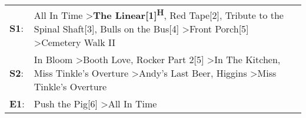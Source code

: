 \begin{supertabular}{p{0.03\textwidth}p{0.92\textwidth}}
 \textbf{S1}:  &                                  All In Time\textsuperscript{} \textgreater \enspace \textbf{The Linear[1]\textsuperscript{H}}, \enspace Red Tape[2]\textsuperscript{}, \enspace Tribute to the Spinal Shaft[3]\textsuperscript{}, \enspace Bulls on the Bus[4]\textsuperscript{} \textgreater \enspace Front Porch[5]\textsuperscript{} \textgreater \enspace Cemetery Walk II\textsuperscript{}  \enspace  \\
 \textbf{S2}:  &  In Bloom\textsuperscript{} \textgreater \enspace Booth Love\textsuperscript{}, \enspace Rocker Part 2[5]\textsuperscript{} \textgreater \enspace In The Kitchen\textsuperscript{}, \enspace Miss Tinkle's Overture\textsuperscript{} \textgreater \enspace Andy's Last Beer\textsuperscript{}, \enspace Higgins\textsuperscript{} \textgreater \enspace Miss Tinkle's Overture\textsuperscript{}  \enspace  \\
 \textbf{E1}:  &                                                                                                                                                                                                                                                                                                             Push the Pig[6]\textsuperscript{} \textgreater \enspace All In Time\textsuperscript{}  \enspace  \\
\end{supertabular}
